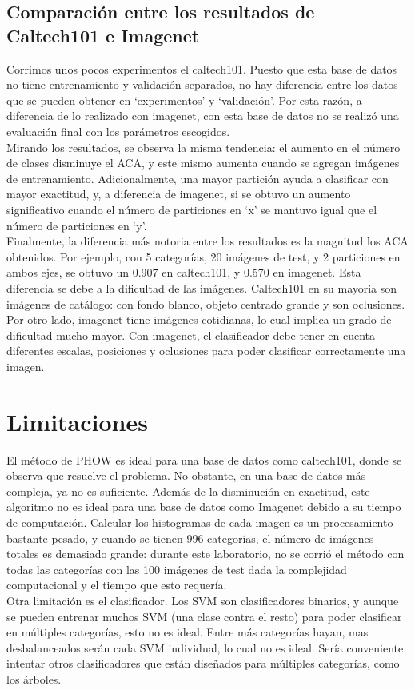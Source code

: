 \documentclass[10pt,twocolumn,letterpaper]{article}
\begin{document}
\subsection{Comparación entre los resultados de Caltech101 e Imagenet}
Corrimos unos pocos experimentos el caltech101. Puesto que esta base de datos no tiene entrenamiento y validación separados, no hay diferencia entre los datos que se pueden obtener en ‘experimentos’ y ‘validación’. Por esta razón, a diferencia de lo realizado con imagenet, con esta base de datos no se realizó una evaluación final con los parámetros escogidos. \\
Mirando los resultados, se observa la misma tendencia: el aumento en el número de clases disminuye el ACA, y este mismo aumenta cuando se agregan imágenes de entrenamiento. Adicionalmente, una mayor partición ayuda a clasificar con mayor exactitud, y, a diferencia de imagenet, si se obtuvo un aumento significativo cuando el número de particiones en ‘x’ se mantuvo igual que el número de particiones en ‘y’.\\
Finalmente, la diferencia más notoria entre los resultados es la magnitud los ACA obtenidos. Por ejemplo, con 5 categorías, 20 imágenes de test, y 2 particiones en ambos ejes, se obtuvo un 0.907 en caltech101, y 0.570 en imagenet. Esta diferencia se debe a la dificultad de las imágenes. Caltech101 en su mayoria son imágenes de catálogo: con fondo blanco, objeto centrado grande y son oclusiones. Por otro lado, imagenet tiene imágenes cotidianas, lo cual implica un grado de dificultad mucho mayor. Con imagenet, el clasificador debe tener en cuenta diferentes escalas, posiciones y oclusiones para poder clasificar correctamente una imagen.

\section{Limitaciones}
El método de PHOW es ideal para una base de datos como caltech101, donde se observa que resuelve el problema. No obstante, en una base de datos más compleja, ya no es suficiente. Además de la disminución en exactitud, este algoritmo no es ideal para una base de datos como Imagenet debido a su tiempo de computación. Calcular los histogramas de cada imagen es un procesamiento bastante pesado, y cuando se tienen 996 categorías, el número de imágenes totales es demasiado grande: durante este laboratorio, no se corrió el método con todas las categorías con las 100 imágenes de test dada la complejidad computacional y el tiempo que esto requería. \\
Otra limitación es el clasificador. Los SVM son clasificadores binarios, y aunque se pueden entrenar muchos SVM (una clase contra el resto) para poder clasificar en múltiples categorías, esto no es ideal. Entre más categorías hayan, mas desbalanceados serán cada SVM individual, lo cual no es ideal. Sería conveniente intentar otros clasificadores que están diseñados para múltiples categorías, como los árboles.
\end{document}
